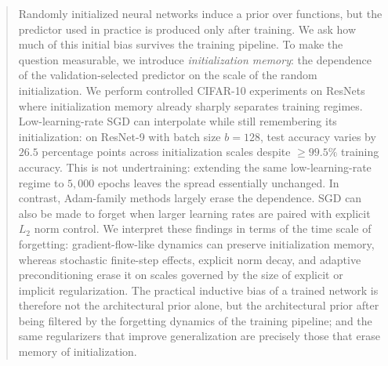 \documentclass{article}
\begin{document}
\begin{abstract}
Randomly initialized neural networks induce a prior over functions, but the predictor used in practice is produced only after training.  We ask how much of this initial bias survives the training pipeline.  To make the question measurable, we introduce \emph{initialization memory}: the dependence of the validation-selected predictor on the scale of the random initialization.  We perform controlled CIFAR-10 experiments on ResNets where initialization memory already sharply separates training regimes.  Low-learning-rate SGD can interpolate while still remembering its initialization: on ResNet-9 with batch size $b=128$, test accuracy varies by $26.5$ percentage points across initialization scales despite $\ge99.5\%$ training accuracy.  This is not undertraining: extending the same low-learning-rate regime to $5{,}000$ epochs leaves the spread essentially unchanged. In contrast, Adam-family methods largely erase the dependence. SGD can also be made to forget when larger learning rates are paired with explicit $L_2$ norm control.  We interpret these findings in terms of the time scale of forgetting: gradient-flow-like dynamics can preserve initialization memory, whereas stochastic finite-step effects, explicit norm decay, and adaptive preconditioning erase it on scales governed by the size of explicit or implicit regularization. The practical inductive bias of a trained network is therefore not the architectural prior alone, but the architectural prior after being filtered by the forgetting dynamics of the training pipeline; and the same regularizers that improve generalization are precisely those that erase memory of initialization. 
\end{abstract}

\end{document}
